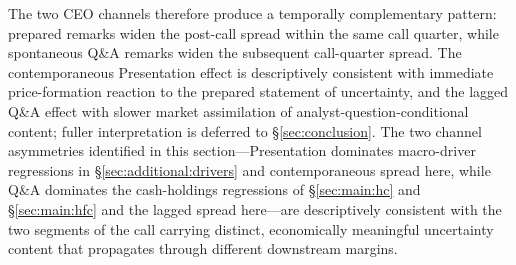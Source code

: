 The two CEO channels therefore produce a temporally complementary pattern: prepared remarks widen the post-call spread within the same call quarter, while spontaneous Q\&A remarks widen the subsequent call-quarter spread. The contemporaneous Presentation effect is descriptively consistent with immediate price-formation reaction to the prepared statement of uncertainty, and the lagged Q\&A effect with slower market assimilation of analyst-question-conditional content; fuller interpretation is deferred to \S\ref{sec:conclusion}. The two channel asymmetries identified in this section---Presentation dominates macro-driver regressions in \S\ref{sec:additional:drivers} and contemporaneous spread here, while Q\&A dominates the cash-holdings regressions of \S\ref{sec:main:hc} and \S\ref{sec:main:hfc} and the lagged spread here---are descriptively consistent with the two segments of the call carrying distinct, economically meaningful uncertainty content that propagates through different downstream margins.
